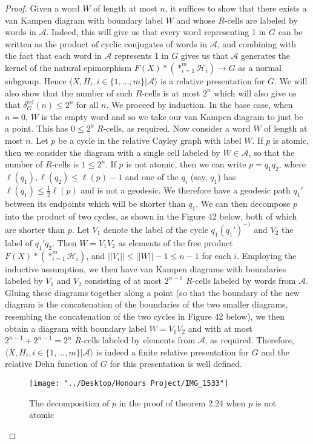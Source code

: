 \documentclass[12pt]{article}
\begin{document}
	\begin{proof}
		
		Given a word $W$ of length at most $n$, it suffices to show that there exists a van Kampen diagram with boundary label $W$ and whose $R$-cells are labeled by words in $\mathcal{A}$. Indeed, this will give us that every word representing 1 in $G$ can be written as the product of cyclic conjugates of words in $\mathcal{A}$, and combining with the fact that each word in $\mathcal{A}$ represents 1 in $G$ gives us that $\mathcal{A}$ generates the kernel of the natural epimorphism $F(X) * (*_{i=1}^m \mathcal{H}_i) \rightarrow G$ as a normal subgroup. Hence $\langle X, H_i, i \in \{1,...,m\} \vert \mathcal{A} \rangle$ is a relative presentation for $G$. We will also show that the number of such $R$-cells is at most $2^n$ which will also give us that $\delta_G^{\text{rel}}(n) \leq 2^n$ for all $n$. We proceed by induction. In the base case, when $n = 0$, $W$ is the empty word and so we take our van Kampen diagram to just be a point. This has $0 \leq 2^0$ $R$-cells, as required. Now consider a word $W$ of length at most $n$. Let $p$ be a cycle in the relative Cayley graph with label $W$. If $p$ is atomic, then we consider the diagram with a single cell labeled by $W \in \mathcal{A}$, so that the number of $R$-cells is $1 \leq 2^n$. If $p$ is not atomic, then we can write $p = q_1 q_2$, where $\ell(q_1), \ell(q_2) \leq \ell(p) - 1$ and one of the $q_i$ (say, $q_1$) has $\ell(q_1) \leq \frac{1}{2} \ell(p)$ and is not a geodesic. We therefore have a geodesic path $q_1'$ between its endpoints which will be shorter than $q_1$. We can then decompose $p$ into the product of two cycles, as shown in the Figure 42 below, both of which are shorter than $p$. Let $V_1$ denote the label of the cycle $q_1 (q_1')^{-1}$ and $V_2$ the label of $q_1' q_2$. Then $W = V_1 V_2$ as elements of the free product $F(X) * (*_{i = 1}^m \mathcal{H}_i)$, and $\vert \vert V_i \vert \vert \leq \vert \vert W \vert \vert - 1 \leq n - 1$ for each $i$. Employing the inductive assumption, we then have van Kampen diagrams with boundaries labeled by $V_1$ and $V_2$ consisting of at most $2^{n-1}$ $R$-cells labeled by words from $\mathcal{A}$. Gluing these diagrams together along a point (so that the boundary of the new diagram is the concatenation of the boundaries of the two smaller diagrams, resembing the concatenation of the two cycles in Figure 42 below), we then obtain a diagram with boundary label $W = V_1 V_2$ and with at most $2^{n-1} + 2^{n-1} = 2^n$ $R$-cells labeled by elements from $\mathcal{A}$, as required. Therefore, $\langle X, H_i, i \in \{1,...,m\} \vert \mathcal{A} \rangle$ is indeed a finite relative presentation for $G$ and the relative Dehn function of $G$ for this presentation is well defined.
		
\begin{figure} [H]
	\centering
	\texttt{[image: "../Desktop/Honours Project/IMG\_1533"]}
	\caption{The decomposition of $p$ in the proof of theorem 2.24 when $p$ is not atomic}
	\label{fig:img1533}
\end{figure}
		
	\end{proof}
	
\end{document}
